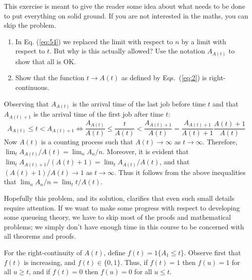 \begin{question}
  This exercise is meant to give the reader some idea about what needs
  to be done to put everything on solid ground.  If you are not
  interested in the maths, you can skip the problem.
    \begin{enumerate}
    \item In
    Eq. (\ref{eq:54}) we replaced the limit with respect to $n$ by a
    limit with respect to $t$.  But why is this actually allowed?  Use
    the notation $A_{A(t)}$ to show that all is OK.
  \item 
  Show that the function $t\to A(t)$ as defined by Eqs.~(\ref{eq:2})
  is right-continuous. 
    \end{enumerate}

    \begin{hint}
      
    \end{hint}

 \begin{solution}
 Observing that $A_{A(t)}$ is the arrival time of the last job
    before time $t$ and that $A_{A(t)+1}$ is the arrival time of the
    first job after time $t$: 
  \begin{equation*}
    A_{A(t)}  \leq t  < A_{A(t)+1} \Leftrightarrow 
    \frac{A_{A(t)}} {A(t)}  \leq \frac{t}{A(t)}  <\frac{A_{A(t)+1}}{A(t)} = \frac{A_{A(t)+1}}{A(t)+1}\frac{A(t)+1}{A(t)}
  \end{equation*}
  Now $A(t)$ is a counting process such that $A(t)\to\infty$ as
  $t\to\infty$. Therefore, $\lim_t A_{A(t)}/A(t) = \lim_n
  A_n/n$.
  Moreover, it is evident that
  $\lim_t A_{A(t)+1}/(A(t)+1) = \lim_t A_{A(t)}/A(t)$, and that
  $(A(t)+1)/A(t)\to 1$ as $t\to\infty$. Thus it follows from the above
  inequalities that $\lim_n A_n/n = \lim_t t/A(t)$.
     

  Hopefully this problem, and its solution, clarifies that even such
  small details require attention. If we want to make some progress
  with respect to developing some queueing theory, we have to skip
  most of the proofs and mathematical problems; we simply don't have
  enough time in this course  to be concerned with all theorems
  and proofs.


  For the right-continuity of $A(t)$, define $f(t) = 1\{A_1 \leq
  t\}$.
  Observe first that $f(t)$ is increasing, and $f(t)\in\{0,1\}$. Thus,
  if $f(t)=1$ then $f(u)=1$ for all $u\geq t$, and if $f(t)=0$ then
  $f(u) = 0$ for all $u\leq t$.


\end{solution}
\end{question}
